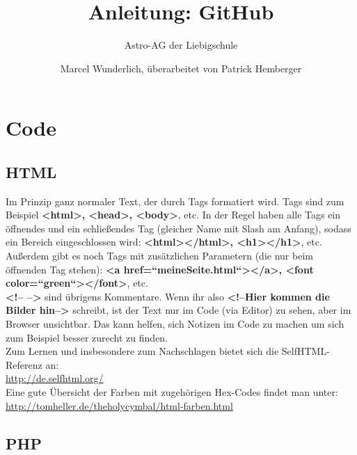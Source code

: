 \documentclass[12pt,a4paper,notitlepage,onecolumn,portrait,oneside, , , ]{scrartcl}
\begin{document}
\title{Anleitung: GitHub}
	\subtitle{Astro-AG der Liebigschule}
\author{Marcel Wunderlich, überarbeitet von Patrick Hemberger}

\maketitle

\section{Code}
\subsection{HTML}
Im Prinzip ganz normaler Text, der durch Tags formatiert wird. Tags sind zum Beispiel \textbf{<html>, <head>, <body>}, etc. In der Regel haben alle Tags ein öffnendes und ein schließendes Tag (gleicher Name mit Slash am Anfang), sodass ein Bereich eingeschlossen wird: \textbf{<html></html>, <h1></h1>}, etc. Außerdem gibt es noch Tags mit zusätzlichen Parametern (die nur beim öffnenden Tag stehen): \textbf{<a href=“meineSeite.html“></a>, <font color=“green“></font>}, etc.\\
\textbf{<!-- -->} sind übrigens Kommentare. Wenn ihr also \textbf{<!--Hier kommen die Bilder hin-->} schreibt, ist der Text nur im Code (via Editor) zu sehen, aber im Browser unsichtbar. Das kann helfen, sich Notizen im Code zu machen um sich zum Beispiel besser zurecht zu finden.\\
Zum Lernen und insbesondere zum Nachschlagen bietet sich die SelfHTML-Referenz an:\\
\url{http://de.selfhtml.org/} \\
Eine gute Übersicht der Farben mit zugehörigen Hex-Codes findet man unter: \\
\url{http://tomheller.de/theholycymbal/html-farben.html} \\

\subsection{PHP}




\end{document}
